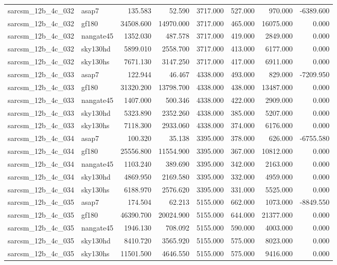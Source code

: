 \begin{tabular}{llrrrrrr}
sarcsm\_12b\_4c\_032 & asap7 & 135.583 & 52.590 & 3717.000 & 527.000 & 970.000 & -6389.600 \\
sarcsm\_12b\_4c\_032 & gf180 & 34508.600 & 14970.000 & 3717.000 & 465.000 & 16075.000 & 0.000 \\
sarcsm\_12b\_4c\_032 & nangate45 & 1352.030 & 487.578 & 3717.000 & 419.000 & 2849.000 & 0.000 \\
sarcsm\_12b\_4c\_032 & sky130hd & 5899.010 & 2558.700 & 3717.000 & 413.000 & 6177.000 & 0.000 \\
sarcsm\_12b\_4c\_032 & sky130hs & 7671.130 & 3147.250 & 3717.000 & 417.000 & 6911.000 & 0.000 \\
sarcsm\_12b\_4c\_033 & asap7 & 122.944 & 46.467 & 4338.000 & 493.000 & 829.000 & -7209.950 \\
sarcsm\_12b\_4c\_033 & gf180 & 31320.200 & 13798.700 & 4338.000 & 438.000 & 13487.000 & 0.000 \\
sarcsm\_12b\_4c\_033 & nangate45 & 1407.000 & 500.346 & 4338.000 & 422.000 & 2909.000 & 0.000 \\
sarcsm\_12b\_4c\_033 & sky130hd & 5323.890 & 2352.260 & 4338.000 & 385.000 & 5207.000 & 0.000 \\
sarcsm\_12b\_4c\_033 & sky130hs & 7118.300 & 2933.060 & 4338.000 & 374.000 & 6176.000 & 0.000 \\
sarcsm\_12b\_4c\_034 & asap7 & 100.320 & 35.138 & 3395.000 & 378.000 & 626.000 & -6755.580 \\
sarcsm\_12b\_4c\_034 & gf180 & 25556.800 & 11554.900 & 3395.000 & 367.000 & 10812.000 & 0.000 \\
sarcsm\_12b\_4c\_034 & nangate45 & 1103.240 & 389.690 & 3395.000 & 342.000 & 2163.000 & 0.000 \\
sarcsm\_12b\_4c\_034 & sky130hd & 4869.950 & 2169.580 & 3395.000 & 332.000 & 4959.000 & 0.000 \\
sarcsm\_12b\_4c\_034 & sky130hs & 6188.970 & 2576.620 & 3395.000 & 331.000 & 5525.000 & 0.000 \\
sarcsm\_12b\_4c\_035 & asap7 & 174.504 & 62.213 & 5155.000 & 662.000 & 1073.000 & -8849.550 \\
sarcsm\_12b\_4c\_035 & gf180 & 46390.700 & 20024.900 & 5155.000 & 644.000 & 21377.000 & 0.000 \\
sarcsm\_12b\_4c\_035 & nangate45 & 1946.130 & 708.092 & 5155.000 & 590.000 & 4003.000 & 0.000 \\
sarcsm\_12b\_4c\_035 & sky130hd & 8410.720 & 3565.920 & 5155.000 & 575.000 & 8023.000 & 0.000 \\
sarcsm\_12b\_4c\_035 & sky130hs & 11501.500 & 4646.550 & 5155.000 & 575.000 & 9416.000 & 0.000 \\

\end{tabular}
